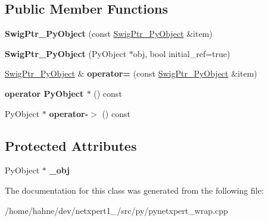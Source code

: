 \subsection*{Public Member Functions}
\begin{DoxyCompactItemize}
\item 
{\bfseries Swig\+Ptr\+\_\+\+Py\+Object} (const \hyperlink{classswig_1_1SwigPtr__PyObject}{Swig\+Ptr\+\_\+\+Py\+Object} \&item)\hypertarget{classswig_1_1SwigPtr__PyObject_a4282f20207f8cd22c9b079203c832a04}{}\label{classswig_1_1SwigPtr__PyObject_a4282f20207f8cd22c9b079203c832a04}

\item 
{\bfseries Swig\+Ptr\+\_\+\+Py\+Object} (Py\+Object $\ast$obj, bool initial\+\_\+ref=true)\hypertarget{classswig_1_1SwigPtr__PyObject_a4503d58d577d209f5e1fa67026852505}{}\label{classswig_1_1SwigPtr__PyObject_a4503d58d577d209f5e1fa67026852505}

\item 
\hyperlink{classswig_1_1SwigPtr__PyObject}{Swig\+Ptr\+\_\+\+Py\+Object} \& {\bfseries operator=} (const \hyperlink{classswig_1_1SwigPtr__PyObject}{Swig\+Ptr\+\_\+\+Py\+Object} \&item)\hypertarget{classswig_1_1SwigPtr__PyObject_a86d8657d6b4a27c8e9e6942bc1ba572c}{}\label{classswig_1_1SwigPtr__PyObject_a86d8657d6b4a27c8e9e6942bc1ba572c}

\item 
{\bfseries operator Py\+Object $\ast$} () const \hypertarget{classswig_1_1SwigPtr__PyObject_aa2f1cdba0651c7a52482d225faef0574}{}\label{classswig_1_1SwigPtr__PyObject_aa2f1cdba0651c7a52482d225faef0574}

\item 
Py\+Object $\ast$ {\bfseries operator-\/$>$} () const \hypertarget{classswig_1_1SwigPtr__PyObject_a97a20cad6a2b0916f39c45555fb559f0}{}\label{classswig_1_1SwigPtr__PyObject_a97a20cad6a2b0916f39c45555fb559f0}

\end{DoxyCompactItemize}
\subsection*{Protected Attributes}
\begin{DoxyCompactItemize}
\item 
Py\+Object $\ast$ {\bfseries \+\_\+obj}\hypertarget{classswig_1_1SwigPtr__PyObject_ae617c5726496db423cd19688e3264618}{}\label{classswig_1_1SwigPtr__PyObject_ae617c5726496db423cd19688e3264618}

\end{DoxyCompactItemize}


The documentation for this class was generated from the following file\+:\begin{DoxyCompactItemize}
\item 
/home/hahne/dev/netxpert1\+\_/src/py/pynetxpert\+\_\+wrap.\+cpp\end{DoxyCompactItemize}
